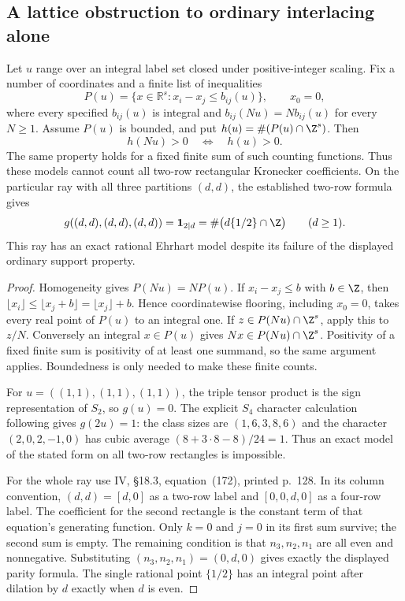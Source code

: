 \subsection{A lattice obstruction to ordinary interlacing alone}
\begin{finding}\label{f:saturation}
Let $u$ range over an integral label set closed under positive-integer scaling. Fix a number of coordinates and a finite list of inequalities
\[
 P(u)=\{x\in\mathbb R^s:x_i-x_j\le b_{ij}(u)\},\qquad x_0=0,
\]
where every specified $b_{ij}(u)$ is integral and $b_{ij}(Nu)=Nb_{ij}(u)$ for every $N\ge1$. Assume $P(u)$ is bounded, and put $h(u)=\#(P(u)\cap\Z^s)$. Then
\[
 h(Nu)>0\quad\Longleftrightarrow\quad h(u)>0.
\]
The same property holds for a fixed finite sum of such counting functions. Thus these models cannot count all two-row rectangular Kronecker coefficients. On the particular ray with all three partitions $(d,d)$, the established two-row formula gives
\[
 g((d,d),(d,d),(d,d))=\boldsymbol1_{2\mid d}
 =\#\bigl(d\{1/2\}\cap\Z\bigr)\qquad(d\ge1).
\]
This ray has an exact rational Ehrhart model despite its failure of the displayed ordinary support property.
\end{finding}
\begin{proof}
Homogeneity gives $P(Nu)=NP(u)$. If $x_i-x_j\le b$ with $b\in\Z$, then
$\lfloor x_i\rfloor\le\lfloor x_j+b\rfloor=\lfloor x_j\rfloor+b$.
Hence coordinatewise flooring, including $x_0=0$, takes every real point of $P(u)$ to an integral one. If $z\in P(Nu)\cap\Z^s$, apply this to $z/N$. Conversely an integral $x\in P(u)$ gives $Nx\in P(Nu)\cap\Z^s$. Positivity of a fixed finite sum is positivity of at least one summand, so the same argument applies. Boundedness is only needed to make these finite counts.

For $u=((1,1),(1,1),(1,1))$, the triple tensor product is the sign representation of $S_2$, so $g(u)=0$. The explicit $S_4$ character calculation following  gives $g(2u)=1$: the class sizes are $(1,6,3,8,6)$ and the character $(2,0,2,-1,0)$ has cubic average $(8+3\cdot8-8)/24=1$. Thus an exact model of the stated form on all two-row rectangles is impossible.

For the whole ray use IV, \S18.3, equation~(172), printed p.~128. In its column convention, $(d,d)=[d,0]$ as a two-row label and $[0,0,d,0]$ as a four-row label. The coefficient for the second rectangle is the constant term of that equation's generating function. Only $k=0$ and $j=0$ in its first sum survive; the second sum is empty. The remaining condition is that $n_3,n_2,n_1$ are all even and nonnegative. Substituting $(n_3,n_2,n_1)=(0,d,0)$ gives exactly the displayed parity formula. The single rational point $\{1/2\}$ has an integral point after dilation by $d$ exactly when $d$ is even.
\end{proof}
